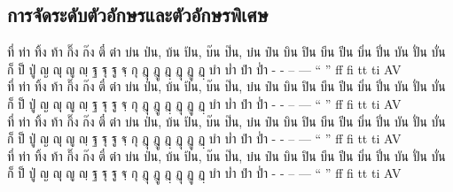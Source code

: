 \documentclass[twocolumn,a4paper]{article}
\begin{document}
\subsection{การจัดระดับตัวอักษรและตัวอักษรพิเศษ}
\noindent
{}
ที่ ท่า ทิ้ง ท้า กิ๊ง ก๊ง ตี๋ ต๋า บ่น ป่น, บ้น ป้น, บ๊น ป๊น, บ๋น ป๋น บิน ปิน บีน ปีน บิ่น ปิ่น บัน ปั่น บั่น ก็ ป็ ปู่ ญ ญุ ญู ญฺ ฐ ฐุ ฐู ฐฺ กุ ฎุ ฎู ฎฺ ฏุ ฏู ฏฺ บำ บ่ำ ปำ ป่ำ -\textyamakkan{} \textfongmun{} \textangkhankhu{} \textkhomut{} - -- --- `` '' ff fi tt ti AV\\
ที่ ท่า ทิ้ง ท้า กิ๊ง ก๊ง ตี๋ ต๋า บ่น ป่น, บ้น ป้น, บ๊น ป๊น, บ๋น ป๋น บิน ปิน บีน ปีน บิ่น ปิ่น บัน ปั่น บั่น ก็ ป็ ปู่ ญ ญุ ญู ญฺ ฐ ฐุ ฐู ฐฺ กุ ฎุ ฎู ฎฺ ฏุ ฏู ฏฺ บำ บ่ำ ปำ ป่ำ -\textyamakkan{} \textfongmun{} \textangkhankhu{} \textkhomut{} - -- --- `` '' ff fi tt ti AV\\
ที่ ท่า ทิ้ง ท้า กิ๊ง ก๊ง ตี๋ ต๋า บ่น ป่น, บ้น ป้น, บ๊น ป๊น, บ๋น ป๋น บิน ปิน บีน ปีน บิ่น ปิ่น บัน ปั่น บั่น ก็ ป็ ปู่ ญ ญุ ญู ญฺ ฐ ฐุ ฐู ฐฺ กุ ฎุ ฎู ฎฺ ฏุ ฏู ฏฺ บำ บ่ำ ปำ ป่ำ -\textyamakkan{} \textfongmun{} \textangkhankhu{} \textkhomut{} - -- --- `` '' ff fi tt ti AV\\
ที่ ท่า ทิ้ง ท้า กิ๊ง ก๊ง ตี๋ ต๋า บ่น ป่น, บ้น ป้น, บ๊น ป๊น, บ๋น ป๋น บิน ปิน บีน ปีน บิ่น ปิ่น บัน ปั่น บั่น ก็ ป็ ปู่ ญ ญุ ญู ญฺ ฐ ฐุ ฐู ฐฺ กุ ฎุ ฎู ฎฺ ฏุ ฏู ฏฺ บำ บ่ำ ปำ ป่ำ -\textyamakkan{} \textfongmun{} \textangkhankhu{} \textkhomut{} - -- --- `` '' ff fi tt ti AV\\
\end{document}
